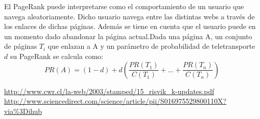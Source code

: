 \documentclass[a4paper, 11pt]{article} %
\begin{document}
		El PageRank puede interpretarse como el comportamiento de un usuario que navega aleatoriamente. Dicho usuario navega entre las distintas webs a través de los enlaces de dichas páginas. Además se tiene en cuenta que el usuario puede en un momento dado abandonar la página actual.Dada una página A, un conjunto de páginas $T_i$ que enlazan a A y un parámetro de probabilidad de teletransporte $d$ su PageRank se calcula como:\\
		\[
		 PR(A)=(1-d)+d(\frac{PR(T_1)}{C(T_1)}+...+\frac{PR(T_n)}{C(T_n)})
		\]
	\begin{thebibliography}{9}

		 \url{http://www.cwr.cl/la-web/2003/stamped/15_risvik_k-updates.pdf}
		 \url{http://www.sciencedirect.com/science/article/pii/S016975529800110X?via\%3Dihub}

	\end{thebibliography}
\end{document}
